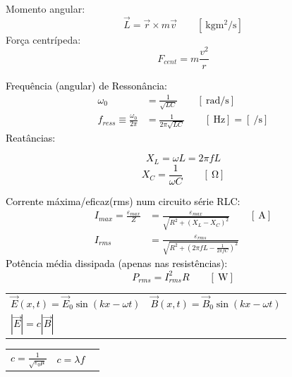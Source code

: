 \documentclass[a4paper,10pt]{extarticle} %
\newcommand{\mybox}[2]{
    \begin{tcolorbox}[colback=lightblue!5!white,colframe=lightblue!75!black,boxsep=1pt,arc=0pt,outer arc=0pt,title={\textcolor{black}{#1}}]
        \textcolor{black}{#2}
    \end{tcolorbox}
}
\begin{document}
\begin{multicols}{2}
{    Momento angular:
    \begin{equation*}
        \vec{L} =  \vec{r} \times m \vec{v} \qquad [\SI{}{\kilogram\meter\squared\per\second}]
    \end{equation*}
    Força centrípeda:
    \begin{equation*}
        F_{cent} =  m \frac{v^2}{r} 
    \end{equation*}
}
\mybox{Circuitos RLC em Corrente Alternada (AC)}{
    Frequência (angular) de Ressonância:
    \begin{align}
        \omega_0 &= \frac{1}{\sqrt{LC}}  \qquad [\SI{}{\radian\per\second}] \\
        f_{ress} \equiv \frac{\omega_0}{2 \pi} &= \frac{1}{2 \pi \sqrt{LC}}  \qquad [\SI{}{\hertz}] = [\SI{}{\per\second}] 
    \end{align}
    Reatâncias:
    \begin{multicols}{2}
    \begin{equation*}
        X_L = \omega  L = 2 \pi f L 
    \end{equation*}
    \begin{equation}
        X_C = \frac{1}{\omega C} \qquad [\SI{}{\ohm}]
    \end{equation}
    \end{multicols}
    Corrente máxima/eficaz(rms) num circuito série RLC:
    \begin{align}
        I_{max} = \frac{\varepsilon_{max}}{Z} &= \frac{\varepsilon_{max}}{\sqrt{R^2 + \left( X_L - X_C\right)^2}}\qquad [\SI{}{\ampere}]\\
        I_{rms}   &= \frac{\varepsilon_{rms}}{\sqrt{R^2 + \left( 2 \pi f L - \frac{1}{2 \pi f C} \right)^2}}
    \end{align}
    Potência média dissipada (apenas nas resistências):
    \begin{equation}
        P_{rms} = I_{rms}^2 R  \qquad [\SI{}{\watt}]
    \end{equation}
}
\mybox{Ondas Electromagnéticas (EM)}{
    \begin{tabular}{ll}
        $\vec{E}(x,t) = \vec{E}_0 \sin(kx- \omega t)$ & $\vec{B}(x,t) = \vec{B}_0 \sin(kx- \omega t)$ \\ 
        $|\vec{E}| = c|\vec{B}|$ & \\
        \hline
    \end{tabular} 
    \begin{tabular}{lll}
        $c = \frac{1}{\sqrt{\varepsilon_0 \mu}}$ &$c = \lambda f$ & \\

\end{tabular}}
\end{multicols}
\end{document}
